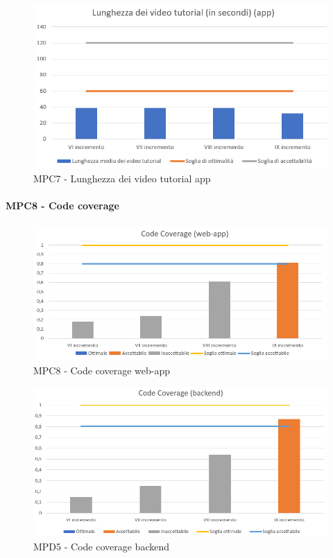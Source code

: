   \begin{figure}[h!]
    \centering
      \includegraphics[scale=1]{Immagini/lunghVideoTut APPA.PNG}
    \caption{MPC7 - Lunghezza dei video tutorial app}
  \end{figure}



  \clearpage
  \paragraph{MPC8 - Code coverage}
  \begin{figure}[h!]
    \centering
      \includegraphics[scale=0.8]{Immagini/CodeCov WAA.PNG}
    \caption{MPC8 - Code coverage web-app}
  \end{figure}

  \begin{figure}[h!]
    \centering
      \includegraphics[scale=0.8]{Immagini/CodeCov BEA.PNG}
    \caption{MPD5 - Code coverage backend}
  \end{figure}

